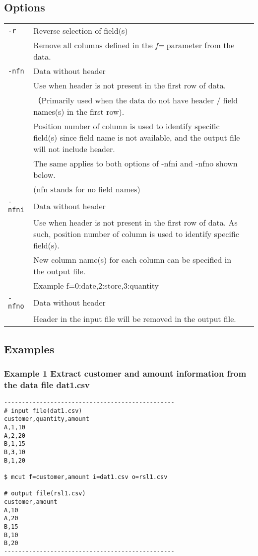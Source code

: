 \documentclass[a4paper]{jarticle}
\begin{document}
\subsection*{Options}
\begin{table}[htbp]
{\small
\begin{tabular}{l p{15cm} l}
\verb|-r|    & Reverse selection of field(s) \\
& Remove all columns defined in the \emph{f=} parameter from the data.\\
\verb|-nfn|  & Data without header \\
&  Use when header is not present in the first row of data.\\
&（Primarily used when the data do not have header / field names(s) in the first row). \\
& Position number of column is used to identify specific field(s) since field name is not available, and the output file will not include header.\\
& The same applies to both options of -nfni and -nfno shown below.\\
& (nfn stands for no field names)\\
\verb|-nfni| &  Data without header \\
& Use when header is not present in the first row of data. As such, position number of column is used to identify specific field(s). \\
& New column name(s) for each column can be specified in the output file. \\
& Example f=0:date,2:store,3:quantity \\
\verb|-nfno| & Data without header\\
& Header in the input file will be removed in the output file. \\
\end{tabular} 
}
\end{table} 

\subsection*{Examples}
\subsubsection*{Example 1 Extract customer and amount information from the data file dat1.csv}

\begin{verbatim}
------------------------------------------------
# input file(dat1.csv)
customer,quantity,amount
A,1,10
A,2,20
B,1,15
B,3,10
B,1,20

$ mcut f=customer,amount i=dat1.csv o=rsl1.csv

# output file(rsl1.csv)
customer,amount
A,10
A,20
B,15
B,10
B,20
------------------------------------------------
\end{verbatim}
\end{document}
